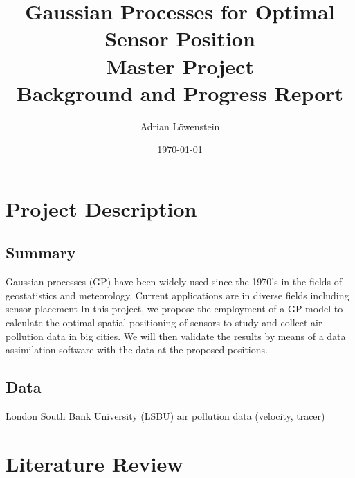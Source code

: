 \documentclass[11pt,a4paper]{article}
\title{Gaussian Processes for Optimal Sensor Position \\
Master Project \\
Background and Progress Report 
}							%
\author{Adrian Löwenstein}								%
\date{\today}											%
\numberwithin{equation}{section}
\begin{document}
\maketitle
\pagebreak

\section{Project Description}

\subsection{Summary}
Gaussian processes (GP) have been widely used since the 1970’s in the fields of geostatistics and meteorology. Current applications are in diverse fields including sensor placement
In this project, we propose the employment of a GP model to calculate the optimal spatial positioning of sensors to study and collect air pollution data in big cities. We will then validate the results by means of a data assimilation software with the data at the proposed positions.

\subsection{Data}
London South Bank University (LSBU) air pollution data (velocity, tracer)

\section{Literature Review}
\end{document}
